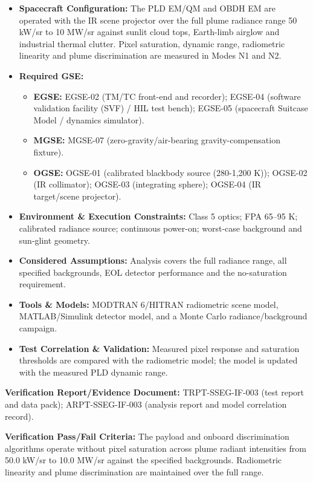 \begin{itemize}
\item \textbf{Spacecraft Configuration:} The PLD EM/QM and OBDH EM are operated with the IR scene projector over the full plume radiance range 50 kW/sr to 10 MW/sr against sunlit cloud tops, Earth-limb airglow and industrial thermal clutter. Pixel saturation, dynamic range, radiometric linearity and plume discrimination are measured in Modes N1 and N2.
\item \textbf{Required GSE:}
\begin{itemize}
\item \textbf{EGSE:} EGSE-02 (TM/TC front-end and recorder); EGSE-04 (software validation facility (SVF) / HIL test bench); EGSE-05 (spacecraft Suitcase Model / dynamics simulator).
\item \textbf{MGSE:} MGSE-07 (zero-gravity/air-bearing gravity-compensation fixture).
\item \textbf{OGSE:} OGSE-01 (calibrated blackbody source (280-1,200 K)); OGSE-02 (IR collimator); OGSE-03 (integrating sphere); OGSE-04 (IR target/scene projector).
\end{itemize}
\item \textbf{Environment \& Execution Constraints:} Class 5 optics; FPA 65--95 K; calibrated radiance source; continuous power-on; worst-case background and sun-glint geometry.
\item \textbf{Considered Assumptions:} Analysis covers the full radiance range, all specified backgrounds, EOL detector performance and the no-saturation requirement.
\item \textbf{Tools \& Models:} MODTRAN 6/HITRAN radiometric scene model, MATLAB/Simulink detector model, and a Monte Carlo radiance/background campaign.
\item \textbf{Test Correlation \& Validation:} Measured pixel response and saturation thresholds are compared with the radiometric model; the model is updated with the measured PLD dynamic range.
\end{itemize}
\par\textbf{Verification Report/Evidence Document:} TRPT-SSEG-IF-003 (test report and data pack); ARPT-SSEG-IF-003 (analysis report and model correlation record).
\par\textbf{Verification Pass/Fail Criteria:} The payload and onboard discrimination algorithms operate without pixel saturation across plume radiant intensities from 50.0 kW/sr to 10.0 MW/sr against the specified backgrounds. Radiometric linearity and plume discrimination are maintained over the full range.
\par\medskip
